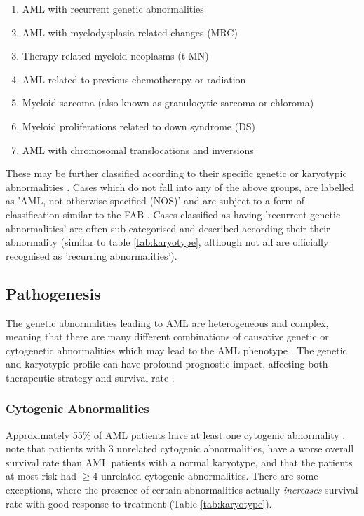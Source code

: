\begin{enumerate}
\item AML with recurrent genetic abnormalities
\item AML with myelodysplasia-related changes (MRC)
\item Therapy-related myeloid neoplasms (t-MN)
\item AML related to previous chemotherapy or radiation
\item Myeloid sarcoma (also known as granulocytic sarcoma or chloroma)
\item Myeloid proliferations related to down syndrome (DS)
\item AML with chromosomal translocations and inversions
\end{enumerate}

These may be further classified according to their specific genetic or karyotypic abnormalities \citep{whoclassification}. Cases which do not fall into any of the above groups, are labelled as 'AML, not otherwise specified (NOS)' and are subject to a form of classification similar to the \ac{FAB} \citep{ACS2018}. Cases classified as having 'recurrent genetic abnormalities' are often sub-categorised and described according their their abnormality (similar to table \ref{tab:karyotype}, although not all are officially recognised as 'recurring abnormalities').


\subsection{Pathogenesis}
The genetic abnormalities leading to \ac{AML} are heterogeneous and complex, meaning that there are many different combinations of causative genetic or cytogenetic abnormalities which may lead to the \ac{AML} phenotype \citep{lindsley2015acute, whoclassification}. The genetic and karyotypic profile can have profound prognostic impact, affecting both therapeutic strategy and survival rate \citep{mrozek2000prognostic, whoclassification}. 

\subsubsection{Cytogenic Abnormalities}
Approximately 55\% of \ac{AML} patients have at least one cytogenic abnormality \citep{meyer2014translational}.  \cite{stolzel2016karyotype} note that patients with 3 unrelated cytogenic abnormalities, have a worse overall survival rate than \ac{AML} patients with a normal karyotype, and that the patients at most risk had $ \geq $4 unrelated cytogenic abnormalities. There are some exceptions, where the presence of certain abnormalities actually \textit{increases} survival rate with good response to treatment (Table \ref{tab:karyotype}). 

